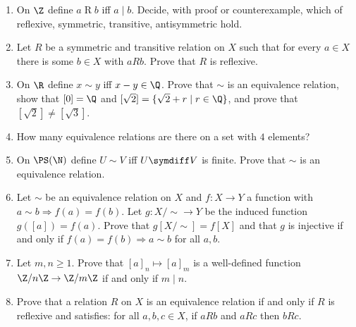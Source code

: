 \begin{stretchbox}[5]
\begin{enumerate}[label=\textbf{S5.\arabic*}, leftmargin=3em]
\item On $\Z$ define $a\mathrel Rb$ iff $a\mid b$. Decide, with proof or counterexample, which of reflexive, symmetric, transitive, antisymmetric hold.
\item Let $R$ be a symmetric and transitive relation on $X$ such that for every $a\in X$ there is some $b\in X$ with $aRb$. Prove that $R$ is reflexive.
\item On $\R$ define $x\sim y$ iff $x-y\in\Q$. Prove that $\sim$ is an equivalence relation, show that $[0]=\Q$ and $[\sqrt2]=\{\sqrt2+r\mid r\in\Q\}$, and prove that $[\sqrt2]\ne[\sqrt3]$. 
\item How many equivalence relations are there on a set with $4$ elements? 
\item On $\PS(\N)$ define $U\sim V$ iff $U\symdiff V$ is finite. Prove that $\sim$ is an equivalence relation. 
\item Let $\sim$ be an equivalence relation on $X$ and $f:X\to Y$ a function with $a\sim b\Rightarrow f(a)=f(b)$. Let $g:X/{\sim}\to Y$ be the induced function $g([a])=f(a)$. Prove that $g[X/{\sim}]=f[X]$ and that $g$ is injective if and only if $f(a)=f(b)\Rightarrow a\sim b$ for all $a,b$.
\item Let $m,n\ge1$. Prove that $[a]_n\mapsto[a]_m$ is a well-defined function $\Z/n\Z\to\Z/m\Z$ if and only if $m\mid n$.
\item Prove that a relation $R$ on $X$ is an equivalence relation if and only if $R$ is reflexive and satisfies: for all $a,b,c\in X$, if $aRb$ and $aRc$ then $bRc$.
\end{enumerate}
\end{stretchbox}
